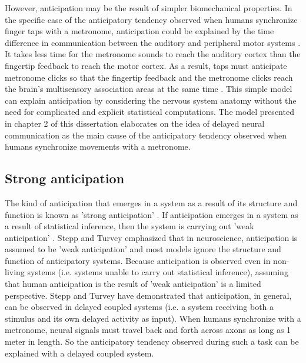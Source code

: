 \documentclass{report}
\begin{document}
However, anticipation may be the result of simpler biomechanical properties. In the specific case of the anticipatory tendency observed when humans synchronize finger taps with a metronome, anticipation could be explained by the time difference in communication between the auditory and peripheral motor systems \cite{aschersleben2002temporal}. It takes less time for the metronome sounds to reach the auditory cortex than the fingertip feedback to reach the motor cortex. As a result, taps must anticipate metronome clicks so that the fingertip feedback and the metronome clicks reach the brain's multisensory association areas at the same time \cite{aschersleben2002temporal}. This simple model can explain anticipation by considering the nervous system anatomy without the need for complicated and explicit statistical computations. The model presented in chapter 2 of this dissertation elaborates on the idea of delayed neural communication as the main cause of the anticipatory tendency observed when humans synchronize movements with a metronome. 

\subsection{Strong anticipation}
The kind of anticipation that emerges in a system as a result of its structure and function is known as 'strong anticipation' \cite{dubois2001incursive}. If anticipation emerges in a system as a result of statistical inference, then the system is carrying out 'weak anticipation' \cite{dubois2001incursive}. Stepp and Turvey \cite{stepp2010strong} emphasized that in neuroscience, anticipation is assumed to be 'weak anticipation' and most models ignore the structure and function of anticipatory systems. Because anticipation is observed even in non-living systems (i.e. systems unable to carry out statistical inference), assuming that human anticipation is the result of 'weak anticipation' is a limited perspective. Stepp and Turvey \cite{stepp2010strong} have demonstrated that anticipation, in general, can be observed in delayed coupled systems (i.e. a system receiving both a stimulus and its own delayed activity as input). When humans synchronize with a metronome, neural signals must travel back and forth across axons as long as 1 meter in length. So the anticipatory tendency observed during such a task can be explained with a delayed coupled system.
\end{document}
